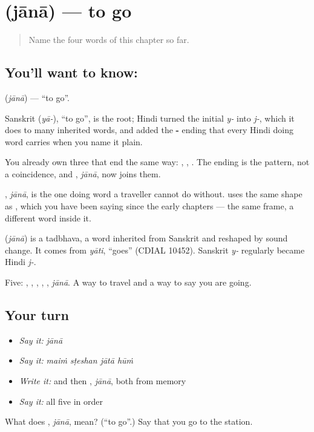 \section[\texorpdfstring{\hi{जाना} / \hi{जाता} (jānā / jātā)}{जाना / जाता (jānā / jātā)}]{ (jānā) — to go}

\label{lesson:HI-C69-go}



\begin{quote}
Name the four words of this chapter so far.
\end{quote}

\subsection*{You'll want to know: }
\textbf{} (\emph{jānā}) — \textquotedblleft{}to go\textquotedblright{}.

Sanskrit  (\emph{yā-}), \textquotedblleft{}to go\textquotedblright{}, is the root; Hindi turned the initial \emph{y-} into \emph{j-}, which it does to many inherited words, and added the \textbf{-} ending that every Hindi doing word carries when you name it plain.

You already own three that end the same way: \textbf{}, \textbf{}, \textbf{}. The ending is the pattern, not a coincidence, and \textbf{}, \emph{jānā}, now joins them.

\textbf{}, \emph{jānā}, is the one doing word a traveller cannot do without. \textbf{   } uses the same shape as \textbf{   }, which you have been saying since the early chapters — the same frame, a different word inside it.

\begin{cousinweb}
\textbf{} (\emph{jānā}) is a tadbhava, a word inherited from Sanskrit and reshaped by sound change. It comes from \emph{yāti}, \textquotedblleft{}goes\textquotedblright{} (CDIAL 10452). Sanskrit \emph{y-} regularly became Hindi \emph{j-}.
\end{cousinweb}

\begin{grammarlens}[title={What you've built}]
Five: , , , , \textbf{}, \emph{jānā}. A way to travel and a way to say you are going.
\end{grammarlens}

\subsection*{Your turn}
\begin{itemize}
\raggedright
  \item \emph{Say it:} \emph{jānā}
  \item \emph{Say it:} \emph{maiṁ sṭeshan jātā hūṁ}
  \item \emph{Write it:}  and then \textbf{}, \emph{jānā}, both from memory
  \item \emph{Say it:} all five in order
\end{itemize}

\begin{tcolorbox}[breakable,colback=teal!4,colframe=teal!35!black,title={Before you move on}]
What does \textbf{}, \emph{jānā}, mean? (\textquotedblleft{}to go\textquotedblright{}.) Say that you go to the station.
\end{tcolorbox}
